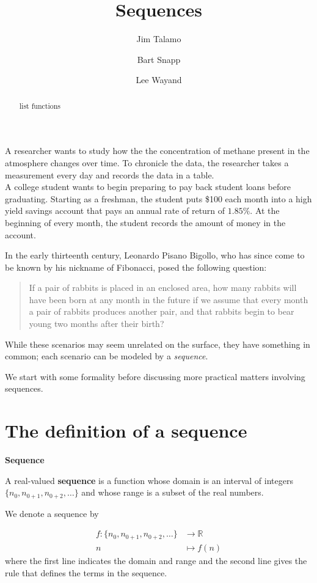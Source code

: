 \documentclass{ximera}
\author{Jim Talamo \and Bart Snapp \and Lee Wayand}
\title{Sequences}
\begin{document}
\begin{abstract}
list functions
\end{abstract}
\maketitle

A researcher wants to study how the the concentration of methane present in the atmosphere changes over time.  To chronicle the data, the researcher takes a measurement every day and records the data in a table. \\

A college student wants to begin preparing to pay back student loans before graduating.  Starting as a freshman, the student puts \$100 each month into a high yield savings account that pays an annual rate of return of $1.85\%$.  At the beginning of every month, the student records the amount of money in the account.

In the early thirteenth century, Leonardo Pisano Bigollo, who has since come to be known by his nickname of Fibonacci, posed the following question:

\begin{quote}
If a pair of rabbits is placed in an enclosed area, how many rabbits will have been born at any month in the future if we assume that every month a pair of rabbits produces another pair, and that rabbits begin to bear young two months after their birth?  
\end{quote}

While these scenarios may seem unrelated on the surface, they have something in common; each scenario can be modeled by a \emph{sequence}.

We start with some formality before discussing more practical matters involving sequences.










\section{The definition of a sequence}

\begin{definition}  \textbf{\textcolor{green!50!black}{Sequence}} 


A real-valued \textbf{sequence} is a function whose domain is an interval of integers $\{n_0,n_{0+1},n_{0+2}, \ldots\}$ and whose range is a subset of the real numbers.  

We denote a sequence by 

\begin{align*}
f : \{n_0,n_{0+1},n_{0+2}, \ldots\} & \to \mathbb R \\
    n &\mapsto f(n)
\end{align*}
where the first line indicates the domain and range and the second line gives the rule that defines the terms in the sequence.
\end{definition}
\end{document}
